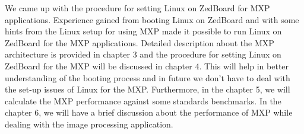 We came up with the procedure for setting Linux on ZedBoard for MXP applications. Experience gained from booting Linux on ZedBoard \cite{17} and with some hints from the Linux setup for using MXP \cite{18} made it possible to run Linux on ZedBoard for the MXP applications. Detailed description about the MXP architecture is provided in chapter 3 and the procedure for setting Linux on ZedBoard for the MXP will be discussed in chapter 4. This will help in better understanding of the booting process and in future we don’t have to deal with the set-up issues of Linux for the MXP. Furthermore, in the chapter 5, we will calculate the MXP performance against some standards benchmarks. In the chapter 6, we will have a brief discussion about the performance of MXP while dealing with the image processing application.  

